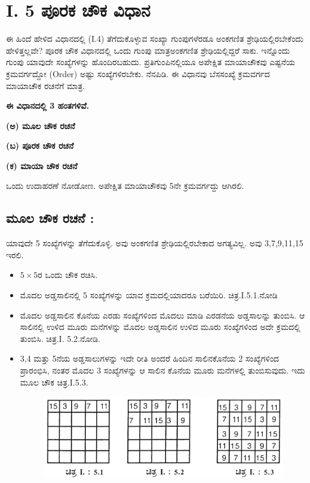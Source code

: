 \newpage

\section*{I. 5 ಪೂರಕ ಚೌಕ ವಿಧಾನ}

ಈ ಹಿಂದೆ ಹೇಳಿದ ವಿಧಾನದಲ್ಲಿ (I.4) ತೆಗೆದುಕೊಳ್ಳುವ ಸಂಖ್ಯಾ ಗುಂಪುಗಳೆರಡೂ ಅಂಕ\-ಗಣಿತ ಶ್ರೇಢಿಯಲ್ಲಿರಬೇಕೆಂದು ಹೇಳಿತ್ತಲ್ಲವೇ? ಪೂರಕ ಚೌಕ ವಿಧಾನದಲ್ಲಿ ಒಂದು ಗುಂಪು ಮಾತ್ರ\break ಅಂಕಗಣಿತ ಶ್ರೇಢಿಯಲ್ಲಿದ್ದರೆ ಸಾಕು. ಇನ್ನೊಂದು ಗುಂಪು ಯಾವುದೇ ಸಂಖ್ಯೆ\-ಗಳನ್ನು ಹೊಂದಿರ\-ಬಹುದು. ಪ್ರತಿಗುಂಪಿನಲ್ಲಿಯೂ ಅಪೇಕ್ಷಿತ ಮಾಯಾಚೌಕವು ಎಷ್ಟನೆಯ ಕ್ರಮ\-ವರ್ಗದ್ದೋ (Order) ಅಷ್ಟು ಸಂಖ್ಯೆಗಳಿರಬೇಕು. ನೆನಪಿಡಿ. ಈ ವಿಧಾನವು ಬೆಸಸಂಖ್ಯೆ ಕ್ರಮ\-ವರ್ಗದ ಮಾಯಾಚೌಕ ರಚನೆಗೆ ಮಾತ್ರ.

\textbf{ಈ ವಿಧಾನದಲ್ಲಿ 3 ಹಂತಗಳಿವೆ.}

\textbf{(ಅ) ಮೂಲ ಚೌಕ ರಚನೆ}

\textbf{(ಬ) ಪೂರಕ ಚೌಕ ರಚನೆ}

\textbf{(ಕ) ಮಾಯಾ ಚೌಕ ರಚನೆ}

ಒಂದು ಉದಾಹರಣೆ ನೋಡೋಣ. ಅಪೇಕ್ಷಿತ ಮಾಯಾಚೌಕವು 5ನೇ ಕ್ರಮವರ್ಗದ್ದು ಆಗಿರಲಿ.

\subsection*{ಮೂಲ ಚೌಕ ರಚನೆ :}

ಯಾವುದೇ 5 ಸಂಖ್ಯೆಗಳನ್ನು ತೆಗೆದುಕೊಳ್ಳಿ. ಅವು ಅಂಕಗಣಿತ ಶ್ರೇಢಿಯಲ್ಲಿರಬೇಕಾದ ಅಗತ್ಯ\-ವಿಲ್ಲ. ಅವು 3,7,9,11,15 ಇರಲಿ.
\begin{itemize}
	\item $5 \times 5$ರ ಒಂದು ಚೌಕ ರಚಿಸಿ.
	\item ಮೊದಲ ಅಡ್ಡಸಾಲಿನಲ್ಲಿ 5 ಸಂಖ್ಯೆಗಳನ್ನು ಯಾವ ಕ್ರಮದಲ್ಲಿಯಾದರೂ ಬರೆಯಿರಿ. ಚಿತ್ರ.I.5.1.ನೋಡಿ
	\item ಮೊದಲ ಅಡ್ಡಸಾಲಿನ ಕೊನೆಯ ಎರಡು ಸಂಖ್ಯೆಗಳಿಂದ ಮೊದಲು ಮಾಡಿ ಎರಡನೆಯ ಅಡ್ಡಸಾಲನ್ನು ತುಂಬಿಸಿ. ಆ ಸಾಲಿನಲ್ಲಿ ಉಳಿದ ಮೂರು ಮನೆಗಳನ್ನು ಮೊದಲ ಅಡ್ಡಸಾಲಿನ ಉಳಿದ ಮೂರು ಸಂಖ್ಯೆಗಳಿಂದ ಅದೇ ಕ್ರಮದಲ್ಲಿ ತುಂಬಿಸಿ. ಚಿತ್ರ.I. 5.2.ನೋಡಿ.
	\item 3,4 ಮತ್ತು 5ನೆಯ ಅಡ್ಡಸಾಲುಗಳನ್ನು ಇದೇ ರೀತಿ ಅಂದರೆ ಹಿಂದಿನ ಸಾಲಿನ\break ಕೊನೆಯ 2 ಸಂಖ್ಯೆಗಳಿಂದ ಪ್ರಾರಂಭಿಸಿ, ನಂತರ ಮೊದಲ 3 ಸಂಖ್ಯೆಗಳನ್ನು ಆ ಸಾಲಿನ ಕೊನೆಯ ಮೂರು ಮನೆಗಳಲ್ಲಿ ತುಂಬಿಸುವುದು. ಇದು ಮೂಲ ಚೌಕ ಚಿತ್ರ.I.5.3.

\newpage

	\begin{figure}[h]
	\includegraphics{src/figures/chap3/fig3.11.jpg}
	\end{figure}
\end{itemize}

